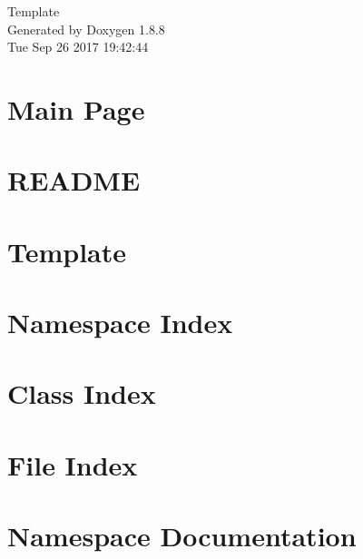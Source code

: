 \documentclass[twoside]{book}
\newcommand{\+}{\discretionary{\mbox{\scriptsize$\hookleftarrow$}}{}{}}
\newcommand{\clearemptydoublepage}{%
  \newpage{\pagestyle{empty}\cleardoublepage}%
}
\begin{document}
\hypersetup{pageanchor=false,
             bookmarks=true,
             bookmarksnumbered=true,
             pdfencoding=unicode
            }
\begin{titlepage}
\vspace*{7cm}
\begin{center}%
{\Large Template }\\
\vspace*{1cm}
{\large Generated by Doxygen 1.8.8}\\
\vspace*{0.5cm}
{\small Tue Sep 26 2017 19:42:44}\\
\end{center}
\end{titlepage}
\clearemptydoublepage
\tableofcontents
\clearemptydoublepage
{}
\hypersetup{pageanchor=true}

\chapter{Main Page}
\label{index}\hypertarget{index}{}
\chapter{R\+E\+A\+D\+M\+E}
\label{d0/d30/md_README}
\hypertarget{d0/d30/md_README}{}

\chapter{Template}
\label{db/db4/md_Template_README}
\hypertarget{db/db4/md_Template_README}{}

\chapter{Namespace Index}

\chapter{Class Index}

\chapter{File Index}

\chapter{Namespace Documentation}






\end{document}
